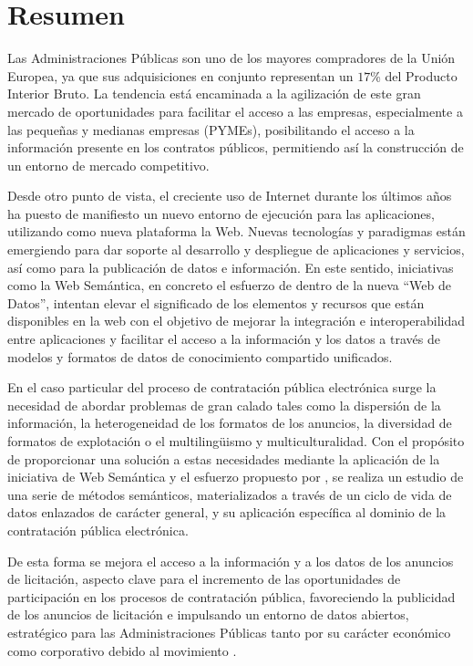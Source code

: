 %
%

\chapter*{Resumen}
Las Administraciones Públicas son uno de los mayores compradores de la Unión Europea, ya que
sus adquisiciones en conjunto representan un $17$\% del Producto Interior Bruto. La tendencia está encaminada 
a la agilización de este gran mercado de oportunidades para facilitar el acceso a las empresas, especialmente a 
las pequeñas y medianas empresas (PYMEs), posibilitando el acceso a la información presente 
en los contratos públicos, permitiendo así la construcción de un entorno de mercado competitivo. 

Desde otro punto de vista, el creciente uso de Internet durante los últimos años ha puesto de manifiesto un
nuevo entorno de ejecución para las aplicaciones, utilizando como nueva plataforma la Web. Nuevas tecnologías y paradigmas
están emergiendo para dar soporte al desarrollo y despliegue de aplicaciones y servicios, así como para la publicación de datos e información. 
En este sentido, iniciativas como la Web Semántica, en concreto el esfuerzo de \linkeddata dentro de la nueva ``Web de Datos'',
 intentan elevar el significado de los elementos y recursos que están disponibles en la web con el objetivo de mejorar 
la integración e interoperabilidad entre aplicaciones y facilitar el acceso a la información y los datos a 
través de modelos y formatos de datos de conocimiento compartido unificados.

En el caso particular del proceso de contratación pública electrónica surge la necesidad de abordar problemas de 
gran calado tales como la dispersión de la información, la heterogeneidad de los formatos de los anuncios, 
la diversidad de formatos de explotación o el multiling\"{u}ismo y multiculturalidad. Con el propósito de proporcionar 
una solución a estas necesidades mediante la aplicación de la iniciativa de Web Semántica y el esfuerzo 
propuesto por \linkeddata, se realiza un estudio de una serie de métodos semánticos, materializados a 
través de un ciclo de vida de datos enlazados de carácter general, y su aplicación 
específica al dominio de la contratación pública electrónica.

De esta forma se mejora el acceso a la información y a los datos de los anuncios de licitación, aspecto clave para 
el incremento de las oportunidades de participación en los procesos de contratación pública, favoreciendo la 
publicidad de los anuncios de licitación e impulsando un entorno de datos abiertos, 
estratégico para las Administraciones Públicas tanto por su carácter económico 
como corporativo debido al movimiento \opendata. 


